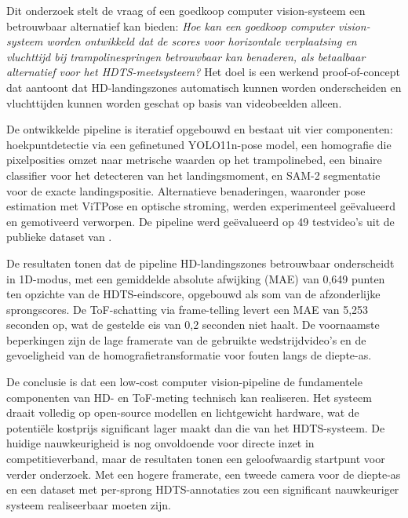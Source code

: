 Dit onderzoek stelt de vraag of een goedkoop computer vision-systeem een betrouwbaar alternatief kan bieden: \textit{Hoe kan een goedkoop computer vision-systeem worden ontwikkeld dat de scores voor horizontale verplaatsing en vluchttijd bij trampolinespringen betrouwbaar kan benaderen, als betaalbaar alternatief voor het HDTS-meetsysteem?} Het doel is een werkend proof-of-concept dat aantoont dat HD-landingszones automatisch kunnen worden onderscheiden en vluchttijden kunnen worden geschat op basis van videobeelden alleen.

De ontwikkelde pipeline is iteratief opgebouwd en bestaat uit vier componenten: hoekpuntdetectie via een gefinetuned YOLO11n-pose model, een homografie die pixelposities omzet naar metrische waarden op het trampolinebed, een binaire classifier voor het detecteren van het landingsmoment, en SAM-2 segmentatie voor de exacte landingspositie. Alternatieve benaderingen, waaronder pose estimation met ViTPose en optische stroming, werden experimenteel geëvalueerd en gemotiveerd verworpen. De pipeline werd geëvalueerd op 49 testvideo's uit de publieke dataset van \textcite{Lin2025}.

De resultaten tonen dat de pipeline HD-landingszones betrouwbaar onderscheidt in 1D-modus, met een gemiddelde absolute afwijking (MAE) van 0,649 punten ten opzichte van de HDTS-eindscore, opgebouwd als som van de afzonderlijke sprongscores. De ToF-schatting via frame-telling levert een MAE van 5,253 seconden op, wat de gestelde eis van 0,2 seconden niet haalt. De voornaamste beperkingen zijn de lage framerate van de gebruikte wedstrijdvideo's en de gevoeligheid van de homografietransformatie voor fouten langs de diepte-as.

De conclusie is dat een low-cost computer vision-pipeline de fundamentele componenten van HD- en ToF-meting technisch kan realiseren. Het systeem draait volledig op open-source modellen en lichtgewicht hardware, wat de potentiële kostprijs significant lager maakt dan die van het HDTS-systeem. De huidige nauwkeurigheid is nog onvoldoende voor directe inzet in competitieverband, maar de resultaten tonen een geloofwaardig startpunt voor verder onderzoek. Met een hogere framerate, een tweede camera voor de diepte-as en een dataset met per-sprong HDTS-annotaties zou een significant nauwkeuriger systeem realiseerbaar moeten zijn.
